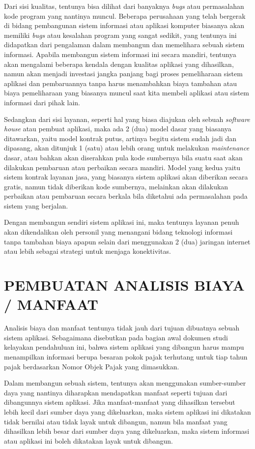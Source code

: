 \documentclass[pdftex,12pt, oneside]{article}
\begin{document}
Dari sisi kualitas, tentunya bisa dilihat dari banyaknya \textit{bugs} atau permasalahan kode program yang nantinya muncul. Beberapa perusahaan yang telah bergerak di bidang pembangunan sistem informasi atau aplikasi komputer biasanya akan memiliki \textit{bugs} atau kesalahan program yang sangat sedikit, yang tentunya ini didapatkan dari pengalaman dalam membangun dan memelihara sebuah sistem informasi. Apabila membangun sistem informasi ini secara mandiri, tentunya akan mengalami beberapa kendala dengan kualitas aplikasi yang dihasilkan, namun akan menjadi investasi jangka panjang bagi proses pemeliharaan sistem aplikasi dan pembaruannya tanpa harus menambahkan biaya tambahan atau biaya pemeliharaan yang biasanya muncul saat kita membeli aplikasi atau sistem informasi dari pihak lain.

Sedangkan dari sisi layanan, seperti hal yang biasa diajukan oleh sebuah \textit{software house} atau pembuat aplikasi, maka ada 2 (dua) model dasar yang biasanya ditawarkan, yaitu model kontrak putus, artinya begitu sistem sudah jadi dan dipasang, akan ditunjuk 1 (satu) atau lebih orang untuk melakukan \textit{maintenance} dasar, atau bahkan akan diserahkan pula kode sumbernya bila suatu saat akan dilakukan pembaruan atau perbaikan secara mandiri. Model yang kedua yaitu sistem kontrak layanan jasa, yang biasanya sistem aplikasi akan diberikan secara gratis, namun tidak diberikan kode sumbernya, melainkan akan dilakukan perbaikan atau pembaruan secara berkala bila diketahui ada permasalahan pada sistem yang berjalan. 

Dengan membangun sendiri sistem aplikasi ini, maka tentunya layanan penuh akan dikendalikan oleh personil yang menangani bidang teknologi informasi tanpa tambahan biaya apapun selain dari menggunakan 2 (dua) jaringan internet atau lebih sebagai strategi untuk menjaga konektivitas.

\section{PEMBUATAN ANALISIS BIAYA / MANFAAT}

Analisis biaya dan manfaat tentunya tidak jauh dari tujuan dibuatnya sebuah sistem aplikasi. Sebagaimana disebutkan pada bagian awal dokumen studi kelayakan pendahuluan ini, bahwa sistem aplikasi yang dibangun harus mampu menampilkan informasi berupa besaran pokok pajak terhutang untuk tiap tahun pajak berdasarkan Nomor Objek Pajak yang dimasukkan.

Dalam membangun sebuah sistem, tentunya akan menggunakan sumber-sumber daya yang nantinya diharapkan mendapatkan manfaat seperti tujuan dari dibangunnya sistem aplikasi. Jika manfaat-manfaat yang dihasilkan tersebut lebih kecil dari sumber daya yang dikeluarkan, maka sistem aplikasi ini dikatakan tidak bernilai atau tidak layak untuk dibangun, namun bila manfaat yang dihasilkan lebih besar dari sumber daya yang dikeluarkan, maka sistem informasi atau aplikasi ini boleh dikatakan layak untuk dibangun.
\end{document}

